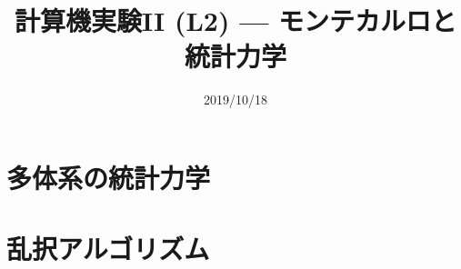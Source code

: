\documentclass[dvipdfmx]{beamer}
\title{計算機実験II (L2) --- モンテカルロと統計力学}
\date{2019/10/18}
\begin{document}
\begin{frame}
  \titlepage
  \tableofcontents
\end{frame}

\section{多体系の統計力学}






\section{乱択アルゴリズム}









\end{document}
